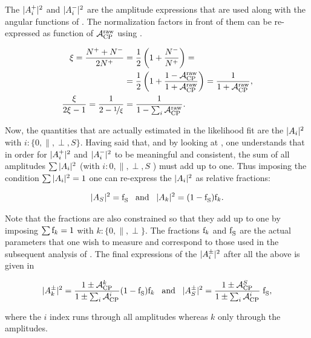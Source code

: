 \noindent The $|{A}_{i}^+|^2$ and $|{A}_{i}^-|^2$ are the amplitude expressions that are used along with the angular functions of .
The normalization factors in front of them can be re-expressed as function of $\mathcal{A}_{\rm CP}^{\text{raw}}$ using .

\begin{align}
\xi = \frac{{N^+}+{N^-}}{2{N^+}} &= \frac{1}{2}\left( 1 + \frac{N^{-}_{}}{N^{+}_{}}\right) = \nonumber \\
                                     &= \frac{1}{2}\left( 1 + \frac{1-\mathcal{A}_{\rm CP}^{\text{raw}}}{1+\mathcal{A}_{\rm CP}^{\text{raw}}}\right) =
                                        \frac{1}{1+\mathcal{A}_{\rm CP}^{\text{raw}}},  \\
\frac{\xi}{2\xi-1} = \frac{1}{2-\nicefrac{1}{\xi}} &= \frac{1}{1-\sum_i\mathcal{A}_{\rm CP}^{\text{raw}}}.
\label{amp_norms}
\end{align}

\noindent Now, the quantities that are actually estimated in the likelihood fit are the $|{A}_{i}|^2$ with $i:\{0,\parallel,\perp,S\}$.
Having said that, and by looking at , one understands that in order for $|{A}_{i}^+|^2$ and $|{A}_{i}^-|^2$
to be meaningful and consistent, the sum of all amplitudes $\sum|{A}_{i}|^2$ (with $i:{0,\parallel,\perp,S}$ ) must add up to one.
Thus imposing the condition $\sum|{A}_{i}|^2 = 1$ one can re-express the $|{A}_{i}|^2$ as relative fractions:

\begin{equation}
|{A}_{S}|^2 = \text{f}_{\text{S}}^{} \;\;\;\text{and}\;\;\; |{A}_{k}|^2 = (1-\text{f}_{\text{S}}^{})\text{f}_{k}.
\label{amps_param}
\end{equation}

\noindent Note that the \pwave fractions are also constrained so that they add up to one by imposing $\sum\text{f}_{k}=1$ with $k:\{0,\parallel,\perp\}$.
The fractions $\text{f}_{k}$ and $\text{f}_{\text{S}}^{}$ are the actual parameters that one wish to measure and correspond to those used in the subsequent analysis of
. The final expressions of the $|{A}_{i}^{\pm}|^2$ after all the above is given in 

\begin{equation}
|{A}_{k}^{\pm}|^2 = \frac{1\pm\mathcal{A}_{\rm CP}^{k}}{1\pm\sum_i\mathcal{A}_{\rm CP}^{i}}  (1-\text{f}_{\text{S}}^{})\text{f}_{k}  \;\;\; \text{and}\;\;\; |{A}_{S}^{\pm}|^2 = \frac{1\pm\mathcal{A}_{\rm CP}^{S}}{1\pm\sum_i\mathcal{A}_{\rm CP}^{i}} \; \text{f}_{\text{S}}^{},
\label{amps_final}
\end{equation}

\noindent where the $i$ index runs through all amplitudes whereas $k$ only through the \pwave amplitudes.

